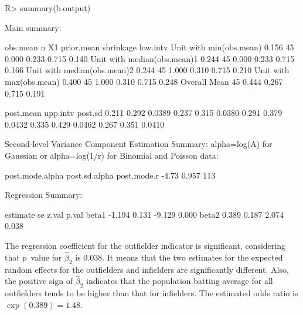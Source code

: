 \documentclass[article]{jss}
\begin{document}
\begin{CodeChunk}
\begin{CodeInput}
R> summary(b.output)
\end{CodeInput}
\begin{CodeOutput}
Main summary:

                            obs.mean  n    X1 prior.mean shrinkage low.intv 
Unit with min(obs.mean)        0.156 45 0.000      0.233     0.715    0.140     
Unit with median(obs.mean)1    0.244 45 0.000      0.233     0.715    0.166     
Unit with median(obs.mean)2    0.244 45 1.000      0.310     0.715    0.210     
Unit with max(obs.mean)        0.400 45 1.000      0.310     0.715    0.248     
Overall Mean                         45 0.444      0.267     0.715    0.191     


                            post.mean upp.intv post.sd
                                0.211    0.292  0.0389
                                0.237    0.315  0.0380
                                0.291    0.379  0.0432
                                0.335    0.429  0.0462
                                0.267    0.351  0.0410

Second-level Variance Component Estimation Summary:
alpha=log(A) for Gaussian or alpha=log(1/r) for Binomial and Poisson data:

post.mode.alpha post.sd.alpha post.mode.r
          -4.73         0.957         113


Regression Summary:

      estimate    se  z.val p.val
beta1   -1.194 0.131 -9.129 0.000
beta2    0.389 0.187  2.074 0.038
\end{CodeOutput}
\end{CodeChunk}

The regression coefficient for the outfielder indicator is significant, considering that $p$~value for $\hat{\beta}_2$ is 0.038. It means that the  two estimates for the expected random effects for the outfielders and infielders are significantly different. Also, the positive sign of $\hat{\beta}_{2}$ indicates that the population batting average for all outfielders tends to be higher than that for infielders. The  estimated odds ratio is $\exp(0.389)=1.48$.
\end{document}
